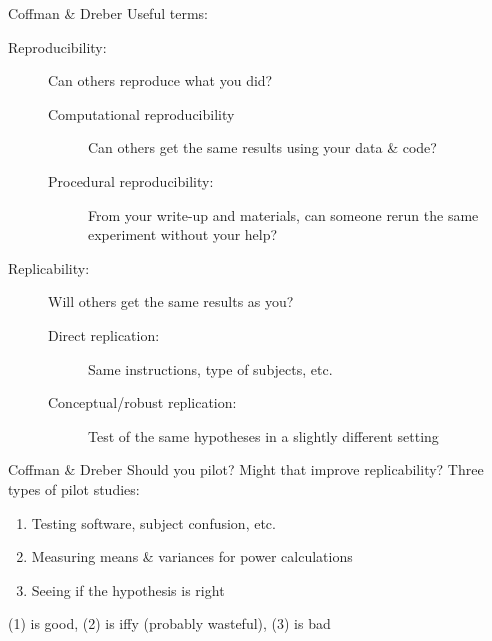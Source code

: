 \begin{frame}{Coffman \& Dreber}
Useful terms:
\begin{description}
    \item[Reproducibility:] Can others reproduce what you did?
    \begin{description}
        \item[Computational reproducibility] Can others get the same results using your data \& code?
        \item[Procedural reproducibility:] From your write-up and materials, can someone rerun the same experiment without your help?
    \end{description}
    \item[Replicability:] Will others get the same results as you?
    \begin{description}
        \item[Direct replication:] Same instructions, type of subjects, etc.
        \item[Conceptual/robust replication:] Test of the same hypotheses in a slightly different setting
    \end{description}
\end{description}
\end{frame}

\begin{frame}{Coffman \& Dreber}
    Should you pilot? Might that improve replicability?
    \br
    Three types of pilot studies:
    \begin{enumerate}
        \item Testing software, subject confusion, etc.
        \item Measuring means \& variances for power calculations
        \item Seeing if the hypothesis is right
    \end{enumerate}
    \br
    \pause
    (1) is good, (2) is iffy (probably wasteful), (3) is bad
\end{frame}

